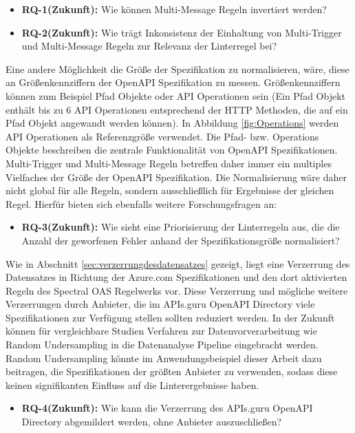   \begin{itemize}
    \item \textbf{RQ-1(Zukunft):} Wie können Multi-Message Regeln invertiert werden?
    \item \textbf{RQ-2(Zukunft):} Wie trägt Inkonsistenz der Einhaltung von Multi-Trigger und Multi-Message Regeln zur Relevanz der Linterregel bei?
  \end{itemize}

  Eine andere Möglichkeit die Größe der Spezifikation zu normalisieren, wäre, diese an Größenkennziffern der OpenAPI Spezifikation zu messen. Größenkennziffern können zum Beispiel Pfad Objekte oder \acs{API} Operationen sein (Ein Pfad Objekt enthält bis zu 6 API Operationen entsprechend der \acs{HTTP} Methoden, die auf ein Pfad Objekt angewandt werden können). In Abbildung \ref{fig:Operations} werden \acs{API} Operationen als Referenzgröße verwendet. Die Pfad- bzw. Operations Objekte beschreiben die zentrale Funktionalität von OpenAPI Spezifikationen. Multi-Trigger und Multi-Message Regeln betreffen daher immer ein multiples Vielfaches der Größe der OpenAPI Spezifikation. Die Normalisierung wäre daher nicht global für alle Regeln, sondern ausschließlich für Ergebnisse der gleichen Regel. Hierfür bieten sich ebenfalls weitere Forschungsfragen an:

  \begin{itemize}
    \item \textbf{RQ-3(Zukunft):} Wie sieht eine Priorisierung der Linterregeln aus, die die Anzahl der geworfenen Fehler anhand der Spezifikationsgröße normalisiert?
  \end{itemize}

  Wie in Abschnitt \ref{sec:verzerrungdesdatensatzes} gezeigt, liegt eine Verzerrung des Datensatzes in Richtung der Azure.com Spezifikationen und den dort aktivierten Regeln des Spectral \acs{OAS} Regelwerks vor. Diese Verzerrung und mögliche weitere Verzerrungen durch Anbieter, die im APIs.guru OpenAPI Directory viele Spezifikationen zur Verfügung stellen sollten reduziert werden. In der Zukunft können für vergleichbare Studien Verfahren zur Datenvorverarbeitung wie Random Undersampling \parencite{hasanin_effects_2018} in die Datenanalyse Pipeline eingebracht werden. Random Undersampling könnte im Anwendungsbeispiel dieser Arbeit dazu beitragen, die Spezifikationen der größten Anbieter zu verwenden, sodass diese keinen signifikanten Einfluss auf die Linterergebnisse haben. 

  \begin{itemize}
    \item \textbf{RQ-4(Zukunft):} Wie kann die Verzerrung des APIs.guru OpenAPI Directory abgemildert werden, ohne Anbieter auszuschließen?
  \end{itemize}


